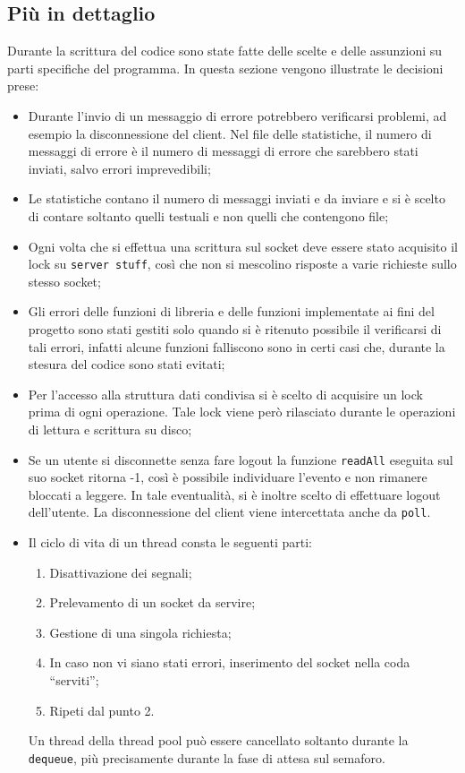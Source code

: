 \documentclass[12pt,a4paper]{article}
\begin{document}
\subsection{Più in dettaglio}
Durante la scrittura del codice sono state fatte delle scelte e delle assunzioni su parti specifiche del programma. In questa sezione vengono illustrate le decisioni prese:
\begin{itemize}
\item Durante l'invio di un messaggio di errore potrebbero verificarsi problemi, ad esempio la disconnessione del client. Nel file delle statistiche, il numero di messaggi di errore è il numero di messaggi di errore che sarebbero stati inviati, salvo errori imprevedibili;
\item Le statistiche contano il numero di messaggi inviati e da inviare e si è scelto di contare soltanto quelli testuali e non quelli che contengono file;
\item Ogni volta che si effettua una scrittura sul socket deve essere stato acquisito il lock su \texttt{server stuff}, così che non si mescolino risposte a varie richieste sullo stesso socket;
\item Gli errori delle funzioni di libreria e delle funzioni implementate ai fini del progetto sono stati gestiti solo quando si è ritenuto possibile il verificarsi di tali errori, infatti alcune funzioni falliscono sono in certi casi che, durante la stesura del codice sono stati evitati;
\item Per l'accesso alla struttura dati condivisa si è scelto di acquisire un lock prima di ogni operazione. Tale lock viene però rilasciato durante le operazioni di lettura e scrittura su disco;
\item Se un utente si disconnette senza fare logout la funzione \texttt{readAll} eseguita sul suo socket ritorna -1, così è possibile individuare l'evento e non rimanere bloccati a leggere. In tale eventualità, si è inoltre scelto di effettuare logout dell'utente. La disconnessione del client viene intercettata anche da \texttt{poll}.
\item Il ciclo di vita di un thread consta le seguenti parti:
	\begin{enumerate}
	\item Disattivazione dei segnali;
	\item Prelevamento di un socket da servire;
	\item Gestione di una singola richiesta;
	\item In caso non vi siano stati errori, inserimento del socket nella coda ``serviti'';
	\item Ripeti dal punto 2.
	\end{enumerate}
	Un thread della thread pool può essere cancellato soltanto durante la {\tt dequeue}, più precisamente durante la fase di attesa sul semaforo.
\end{itemize}
\end{document}
